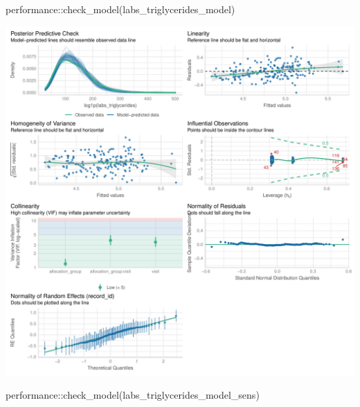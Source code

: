 \documentclass[
  12pt,
]{article}
\newenvironment{Shaded}{\begin{snugshade}}{\end{snugshade}}
\newcommand{\FunctionTok}[1]{\textcolor[rgb]{0.28,0.35,0.67}{#1}}
\newcommand{\NormalTok}[1]{\textcolor[rgb]{0.00,0.23,0.31}{#1}}
\newcommand{\SpecialCharTok}[1]{\textcolor[rgb]{0.37,0.37,0.37}{#1}}
\begin{document}
\begin{Shaded}
\begin{Highlighting}[]
\NormalTok{performance}\SpecialCharTok{::}\FunctionTok{check\_model}\NormalTok{(labs\_triglycerides\_model)}
\end{Highlighting}
\end{Shaded}

\includegraphics{Outcomes_files/figure-pdf/labs_triglycerides_4-1.pdf}

\begin{Shaded}
\begin{Highlighting}[]
\NormalTok{performance}\SpecialCharTok{::}\FunctionTok{check\_model}\NormalTok{(labs\_triglycerides\_model\_sens)}
\end{Highlighting}
\end{Shaded}
\end{document}
